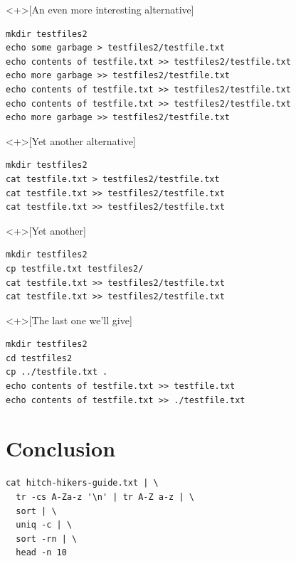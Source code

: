 \begin{frame}[fragile]
  \begin{solution}<+>[An even more interesting alternative]
    \begin{lstlisting}
mkdir testfiles2
echo some garbage > testfiles2/testfile.txt
echo contents of testfile.txt >> testfiles2/testfile.txt
echo more garbage >> testfiles2/testfile.txt
echo contents of testfile.txt >> testfiles2/testfile.txt
echo contents of testfile.txt >> testfiles2/testfile.txt
echo more garbage >> testfiles2/testfile.txt
    \end{lstlisting}
  \end{solution}
\end{frame}

\begin{frame}[fragile]
  \begin{solution}<+>[Yet another alternative]
    \begin{lstlisting}
mkdir testfiles2
cat testfile.txt > testfiles2/testfile.txt
cat testfile.txt >> testfiles2/testfile.txt
cat testfile.txt >> testfiles2/testfile.txt
    \end{lstlisting}
  \end{solution}
  \begin{solution}<+>[Yet another]
    \begin{lstlisting}
mkdir testfiles2
cp testfile.txt testfiles2/
cat testfile.txt >> testfiles2/testfile.txt
cat testfile.txt >> testfiles2/testfile.txt
    \end{lstlisting}
  \end{solution}
\end{frame}

\begin{frame}[fragile]
  \begin{solution}<+>[The last one we'll give]
    \begin{lstlisting}
mkdir testfiles2
cd testfiles2
cp ../testfile.txt .
echo contents of testfile.txt >> testfile.txt
echo contents of testfile.txt >> ./testfile.txt
    \end{lstlisting}
  \end{solution}
\end{frame}


\section{Conclusion}

\begin{frame}[fragile]
  \begin{exercise}
    \begin{lstlisting}[numbers=none]
cat hitch-hikers-guide.txt | \
  tr -cs A-Za-z '\n' | tr A-Z a-z | \
  sort | \
  uniq -c | \
  sort -rn | \
  head -n 10
    \end{lstlisting}
  \end{exercise}
\end{frame}

